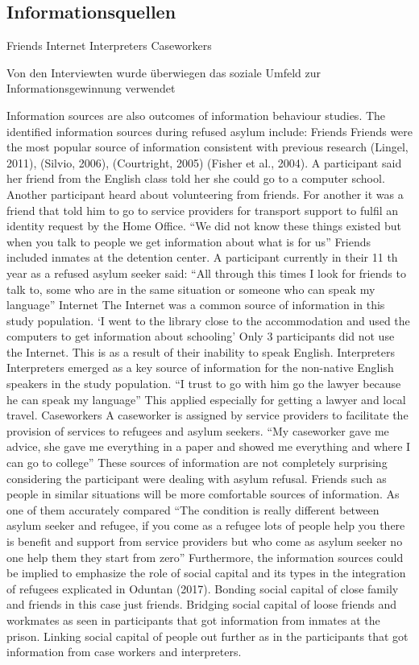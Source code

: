 \subsection{Informationsquellen}
		Friends
		Internet
		Interpreters
		Caseworkers

Von den Interviewten wurde überwiegen das soziale Umfeld zur Informationsgewinnung verwendet

\cite{mykyttschak2018}



Information sources are also outcomes of information
behaviour studies. The identified information sources
during refused asylum include:
Friends
Friends were the most popular source of information
consistent with previous research (Lingel, 2011), (Silvio,
2006), (Courtright, 2005) (Fisher et al., 2004). A participant
said her friend from the English class told her she could go
to a computer school. Another participant heard about
volunteering from friends. For another it was a friend that
told him to go to service providers for transport support to
fulfil an identity request by the Home Office.
“We did not know these things existed but when you
talk to people we get information about what is for
us”
Friends included inmates at the detention center. A
participant currently in their 11 th year as a refused asylum
seeker said:
“All through this times I look for friends to talk to,
some who are in the same situation or someone who
can speak my language”
Internet
The Internet was a common source of information in this
study population.
‘I went to the library close to the accommodation
and used the computers to get information about
schooling’
Only 3 participants did not use the Internet. This is as a
result of their inability to speak English.
Interpreters
Interpreters emerged as a key source of information for the
non-native English speakers in the study population.
“I trust to go with him go the lawyer because he can
speak my language”
This applied especially for getting a lawyer and local travel.
Caseworkers
A caseworker is assigned by service providers to facilitate
the provision of services to refugees and asylum seekers.
“My caseworker gave me advice, she gave me
everything in a paper and showed me everything and
where I can go to college”
These sources of information are not completely surprising
considering the participant were dealing with asylum
refusal. Friends such as people in similar situations will be
more comfortable sources of information. As one of them
accurately compared
“The condition is really different between asylum
seeker and refugee, if you come as a refugee lots of
people help you there is benefit and support from
service providers but who come as asylum seeker no
one help them they start from zero”
Furthermore, the information sources could be implied to
emphasize the role of social capital and its types in the
integration of refugees explicated in Oduntan (2017).
Bonding social capital of close family and friends in this
case just friends. Bridging social capital of loose friends
and workmates as seen in participants that got information
from inmates at the prison. Linking social capital of people
out further as in the participants that got information from
case workers and interpreters.